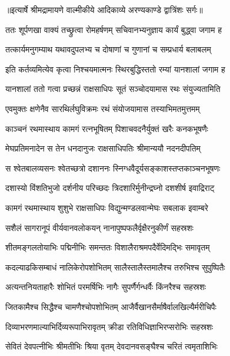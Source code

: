 {॥इत्यार्षे श्रीमद्रामायणे वाल्मीकीये आदिकाव्ये अरण्यकाण्डे द्वात्रिंशः सर्गः॥}


\twolineshloka
{ततः शूर्पणखा वाक्यं तच्छ्रुत्वा रोमहर्षणम्}
{सचिवानभ्यनुज्ञाय कार्यं बुद्ध्वा जगाम ह} %

\twolineshloka
{तत्कार्यमनुगम्याथ यथावदुपलभ्य च}
{दोषाणां च गुणानां च सम्प्रधार्य बलाबलम्} %

\twolineshloka
{इति कर्तव्यमित्येव कृत्वा निश्चयमात्मनः}
{स्थिरबुद्धिस्ततो रम्यां यानशालां जगाम ह} %

\twolineshloka
{यानशालां ततो गत्वा प्रच्छन्नं राक्षसाधिपः}
{सूतं सञ्चोदयामास रथः संयुज्यतामिति} %

\twolineshloka
{एवमुक्तः क्षणेनैव सारथिर्लघुविक्रमः}
{रथं संयोजयामास तस्याभिमतमुत्तमम्} %

\twolineshloka
{काञ्चनं रथमास्थाय कामगं रत्नभूषितम्}
{पिशाचवदनैर्युक्तं खरैः कनकभूषणैः} %

\twolineshloka
{मेघप्रतिमनादेन स तेन धनदानुजः}
{राक्षसाधिपतिः श्रीमान्ययौ नदनदीपतिम्} %

\twolineshloka
{स श्वेतबालव्यसनः श्वेतच्छत्रो दशाननः}
{स्निग्धवैदूर्यसङ्काशस्तप्तकाञ्चनभूषणः} %

\twolineshloka
{दशास्यो विंशतिभुजो दर्शनीय परिच्छदः}
{त्रिदशारिर्मुनीन्द्रघ्नो दशशीर्ष इवाद्रिराट्} %

\twolineshloka
{कामगं रथमास्थाय शुशुभे राक्षसाधिपः}
{विद्युन्मण्डलवान्मेघः सबलाक इवाम्बरे} %

\twolineshloka
{सशैलं सागरानूपं वीर्यवानवलोकयन्}
{नानापुष्पफलैर्वृक्षैरनुकीर्णं सहस्रशः} %

\twolineshloka
{शीतमङ्गलतोयाभिः पद्मिनीभिः समन्ततः}
{विशालैराश्रमपदैर्वेदिमद्भिः समावृतम्} %

\twolineshloka
{कदल्याढकिसम्बाधं नालिकेरोपशोभितम्}
{सालैस्तालैस्तमालैश्च तरुभिश्च सुपुष्पितैः} %

\twolineshloka
{अत्यन्तनियताहारैः शोभितं परमर्षिभिः}
{नागैः सुपर्णैर्गन्धर्वैः किंनरैश्च सहस्रशः} %

\twolineshloka
{जितकामैश्च सिद्धैश्च चामणैश्चोपशोभितम्}
{आजैर्वैखानसैर्माषैर्वालखिल्यैर्मरीचिपैः} %

\twolineshloka
{दिव्याभरणमाल्याभिर्दिव्यरूपाभिरावृतम्}
{क्रीडा रतिविधिज्ञाभिरप्सरोभिः सहस्रशः} %

\twolineshloka
{सेवितं देवपत्नीभिः श्रीमतीभिः श्रिया वृतम्}
{देवदानवसङ्घैश्च चरितं त्वमृताशिभिः} %

